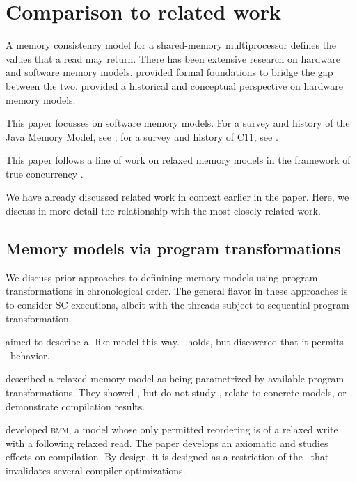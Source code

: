 \section{Comparison to related work}\label{sec:ldrf}
A memory consistency model for a shared-memory multiprocessor defines the
values that a read may return.  There has been extensive research on hardware
and software memory models. \citet{DBLP:journals/pacmpl/PodkopaevLV19}
provided formal foundations to bridge the gap between the two.
\citet{AlglaveThesis} provided a historical and conceptual perspective on
hardware memory models.

This paper focusses on software memory models.  For a survey and history of
the Java Memory Model, see \citep{DBLP:journals/toplas/Lochbihler13}; for a
survey and history of C11, see \citep{DBLP:phd/ethos/Batty15}.

This paper follows a line of work on relaxed memory models in the framework
of true concurrency
\cite{DBLP:conf/lics/JeffreyR16,Pichon-Pharabod:2016:CSR:2837614.2837616,DBLP:conf/esop/CenciarelliKS07}.

We have already discussed related work in context earlier in the paper.
Here, we discuss in more detail the relationship with the most closely
related work.

\subsection{Memory models via program transformations}
We discuss prior approaches to definining memory models using program
transformations in chronological order.  The general flavor in these
approaches is to consider SC executions, albeit with the threads subject to
sequential program transformation.

\citet{Saraswat:2007:TMM:1229428.1229469}
aimed to describe a \jmm-like model this way.  \drfsc\ holds, but \citet{SP} 
discovered that it permits \oota\ behavior.

\citet{DBLP:conf/esop/FerreiraFS10} described a relaxed memory model as being
parametrized by available program transformations.  They showed \drfsc, but do not
study \oota, relate to concrete models, or demonstrate compilation results.

\citet{DBLP:conf/popl/DemangeLZJPV13} developed \textsc{bmm}, a model whose only
permitted reordering is of a relaxed write with a following relaxed read.
The paper develops an axiomatic and studies effects on compilation.  By
design, it is designed as a restriction of the \jmm\ that invalidates several
compiler optimizations.

